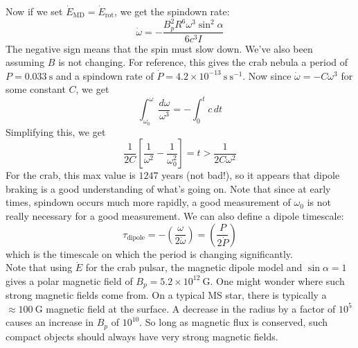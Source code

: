 \documentclass[10pt]{article}
\numberwithin{equation}{section}
\newcommand{\n}{\noindent}
\begin{document}
	Now if we set $\dot{E}_{\mathrm{MD}}=\dot{E}_{\mathrm{rot}}$, we get the spindown rate:
	\begin{equation}
		\label{eq:spindown:7} \dot{\omega} = -\frac{B_p^2R^6\omega^3\sin^2\alpha}{6c^3 I}
	\end{equation}
	The negative sign means that the spin must slow down. We've also been assuming $B$ is not changing. For reference, this gives the crab nebula a period of $P=0.033\ \mathrm{s}$ and a spindown rate of $\dot{P} = 4.2\times 10^{-13}\ \mathrm{s\ s^{-1}}$. Now since $\dot{\omega}=-C\omega^3$ for some constant $C$, we get
	\begin{equation}
		\label{eq:spindown:8} \int_{\omega_0}^\omega \frac{d\omega}{\omega^3} = -\int_0^t c\,dt
	\end{equation}
	Simplifying this, we get
	\begin{equation}
		\label{eq:spindown:9} \frac{1}{2C}\left[\frac{1}{\omega^2}-\frac{1}{\omega_0^2}\right] = t > \frac{1}{2C\omega^2}
	\end{equation}
	For the crab, this max value is $1247$ years (not bad!), so it appears that dipole braking is a good understanding of what's going on. Note that since at early times, spindown occurs much more rapidly, a good measurement of $\omega_0$ is not really necessary for a good measurement. We can also define a dipole timescale:
	\begin{equation}
		\label{eq:spindown:10} \tau_{\mathrm{dipole}} = -\left(\frac{\omega}{2\dot{\omega}}\right) = \left(\frac{P}{2\dot{P}}\right)
	\end{equation}
	which is the timescale on which the period is changing significantly.\\
	
	\n Note that using $\dot{E}$ for the crab pulsar, the magnetic dipole model and $\sin\alpha=1$ gives a polar magnetic field of $B_p = 5.2\times 10^{12}\ \mathrm{G}$. One might wonder where such strong magnetic fields come from. On a typical MS star, there is typically a $\approx 100\ \mathrm{G}$ magnetic field at the surface. A decrease in the radius by a factor of $10^5$ causes an increase in $B_p$ of $10^{10}$. So long as magnetic flux is conserved, such compact objects should always have very strong magnetic fields.	
\end{document}
